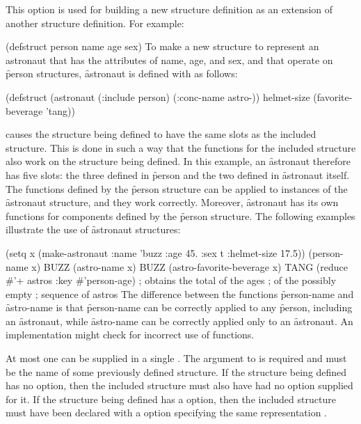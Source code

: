 
This option is used for building a new structure definition as
an extension of another structure definition.  For example:

\code
 (defstruct person name age sex)
\endcode
To make a new structure to represent an astronaut
that has the
attributes of name, age, and sex, and 
that operate on \f{person} structures, \f{astronaut} is defined
with  as follows:

\code
 (defstruct (astronaut (:include person)
                       (:conc-name astro-))
    helmet-size
    (favorite-beverage 'tang))
\endcode

 causes the structure being defined
to have the same slots as the included structure.
This is done in such a way
that the  functions for the included
structure also work on the structure being defined.
In this example, an
\f{astronaut} therefore has five slots: the three defined in
\f{person} and the two defined in \f{astronaut}
itself.  The  functions defined by the \f{person} structure
can be applied to instances of the \f{astronaut} structure, and they
work correctly.
Moreover, \f{astronaut} has its own  functions for
components defined by the \f{person} structure.
The following examples illustrate the 
use of \f{astronaut} structures:

\code
 (setq x (make-astronaut :name 'buzz
                         :age 45.
                         :sex t
                         :helmet-size 17.5))
 (person-name x) \EV BUZZ
 (astro-name x) \EV BUZZ
 (astro-favorite-beverage x) \EV TANG
\endcode
{}
\code
 (reduce #'+ astros :key #'person-age) ; obtains the total of the ages 
                                       ; of the possibly empty
                                       ; sequence of astros
\endcode
{}
The difference between the  functions \f{person-name} and \f{astro-name}
is that \f{person-name} can be correctly applied to any \f{person},
including an \f{astronaut}, while \f{astro-name} can be correctly
applied only to an \f{astronaut}.  An implementation might 
check for incorrect use of  functions.

At most one  can be supplied in a single .
The argument to  is required and must be the
name of some previously defined structure.  If the structure being
defined has no  option, then the included structure must
also have had no  option supplied for it.
If the structure being defined has a  option,
then the included structure must have been declared with a 
option specifying the same representation .


